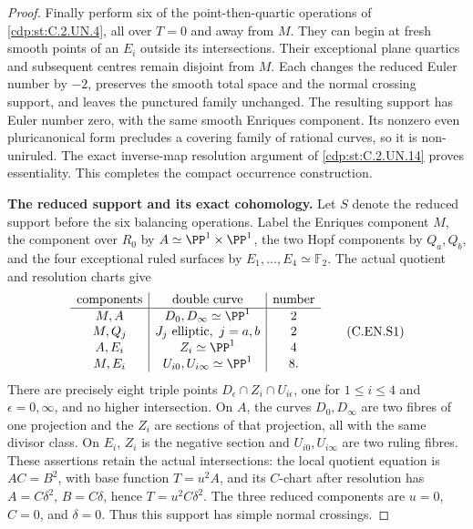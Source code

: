 \begin{proof}
Finally perform six of the point-then-quartic
operations of \ref{cdp:st:C.2.UN.4}, all over $T=0$ and
away from $M$. They can begin at fresh
smooth points of an $E_i$ outside its
intersections. Their exceptional plane
quartics and subsequent centres remain
disjoint from $M$. Each changes the
reduced Euler number by $-2$, preserves
the smooth total space and the normal
crossing support, and leaves the
punctured family unchanged. The resulting
support has Euler number zero, with
the same smooth Enriques component.
Its nonzero even pluricanonical form
precludes a covering family of rational
curves, so it is non-uniruled.
The exact inverse-map resolution argument
of \ref{cdp:st:C.2.UN.14} proves essentiality. This completes
the compact occurrence construction.
\par\medskip\noindent\textbf{The reduced support and its exact cohomology.}
Let $S$ denote the reduced support before the six balancing
operations. Label the Enriques component $M$, the component over
$R_0$ by $A\simeq\PP^1\times\PP^1$, the two Hopf components by
$Q_a,Q_b$, and the four exceptional ruled surfaces by
$E_1,\ldots,E_4\simeq\mathbb F_2$.
The actual quotient and resolution charts give
\[
\begin{array}{c|c|c}
\text{components}&\text{double curve}&\text{number}\\ \hline
M,A&D_0,D_\infty\simeq\PP^1&2\\
M,Q_j&J_j\text{ elliptic},\ j=a,b&2\\
A,E_i&Z_i\simeq\PP^1&4\\
M,E_i&U_{i0},U_{i\infty}\simeq\PP^1&8.
\end{array}                                                   \tag{C.EN.S1}\label{cdp:eq:C.EN.S1}
\]
There are precisely eight triple points
$D_\epsilon\cap Z_i\cap U_{i\epsilon}$, one for
$1\le i\le4$ and $\epsilon=0,\infty$, and no higher
intersection. On $A$, the curves $D_0,D_\infty$ are two
fibres of one projection and the $Z_i$ are sections of that
projection, all with the same divisor class. On $E_i$, $Z_i$
is the negative section and $U_{i0},U_{i\infty}$ are two
ruling fibres. These assertions retain the actual intersections:
the local quotient equation is $AC=B^2$, with base function
$T=u^2A$, and its $C$-chart after resolution has
$A=C\delta^2$, $B=C\delta$, hence $T=u^2C\delta^2$.
The three reduced components are $u=0$, $C=0$, and
$\delta=0$. Thus this support has simple normal crossings.


\end{proof}
